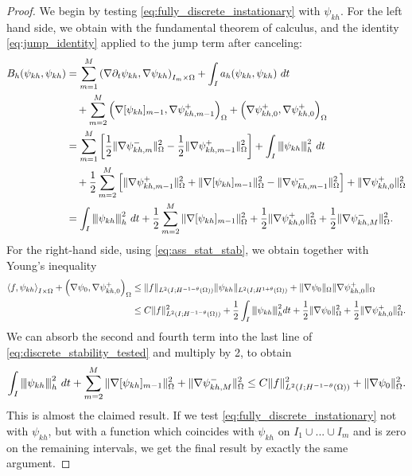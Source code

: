 \documentclass{m2an}
\newcommand{\1}{\mathds{1}}
\newcommand{\Om}{\Omega}
\newcommand{\ImOprod}[1]{\left( #1 \right)_{I_m\times \Omega}}
\newcommand{\IOpair}[1]{\left\langle #1 \right\rangle_{I\times \Omega}}
\newcommand{\psikh}{\psi_{kh}}
\newcommand{\na}{\nabla}
\newcommand{\pa}{\partial}
\newcommand{\vertiii}[1]{{\left\vert\kern-0.25ex\left\vert\kern-0.25ex\left\vert #1
    \right\vert\kern-0.25ex\right\vert\kern-0.25ex\right\vert}}
\newcommand{\Oprod}[1]{\left(#1\right)_{\Omega}}
\theoremstyle{definition}
\begin{document}
\begin{proof}
  We begin by testing \eqref{eq:fully_discrete_instationary} with $\psi_{kh}$. For the left hand side, we obtain
  with the fundamental theorem of calculus, and the identity \eqref{eq:jump_identity} applied 
  to the jump term after canceling:
  \begin{equation}\label{eq:discrete_stability_tested}
    \begin{aligned}
    B_h(\psikh,\psikh)  &= \sum_{m=1}^M \ImOprod{\nabla \pa_t \psikh,\na\psikh} + \int_I a_h(\psikh,\psikh) \ dt\\
                        & \quad + \sum_{m=2}^M \Oprod{\na [\psikh]_{m-1},\na \psi_{kh,m-1}^+} 
                            + \Oprod{\na \psi_{kh,0}^+,\na \psi_{kh,0}^+}\\
                        &= \sum_{m=1}^M \left[\frac12 \|\na \psi_{kh,m}^-\|_\Om^2 - \frac12 \|\na \psi_{kh,m-1}^+\|_\Om^2\right]
                             + \int_I \vertiii{\psikh}^2_h \ dt\\
                        & \quad + \frac12 \sum_{m=2}^M \left[\|\na \psi_{kh,m-1}^+\|_\Om^2 + \|\na [\psi_{kh}]_{m-1}\|_\Om^2 - \|\na \psi_{kh,m-1}^-\|_\Om^2 \right]
                            + \|\na \psi_{kh,0}^+\|_\Om^2\\
                        &=\int_I \vertiii{\psikh}^2_h \ dt + \frac12 \sum_{m=2}^M \|\na [\psi_{kh}]_{m-1}\|_\Om^2 
                          + \frac12 \|\na \psi_{kh,0}^+\|_\Om^2+ \frac12 \|\na \psi_{kh,M}^-\|_\Om^2.
  \end{aligned}
  \end{equation}
  For the right-hand side, using \eqref{eq:ass_stat_stab}, we obtain together with Young's inequality
  \begin{align*}
    \IOpair{f,\psikh} + \Oprod{\na \psi_0,\na \psi_{kh,0}^+}
    &\le \|f\|_{L^2(I;H^{-1-\theta}(\Om))}\|\psikh\|_{L^2(I;H^{1+\theta}(\Om))} + \|\na \psi_0\|_\Om \|\na \psi_{kh,0}^+\|_\Om\\
    &\le C \|f\|_{L^2(I;H^{-1-\theta}(\Om))}^2 + \frac12 \int_I \vertiii{\psikh}_h^2 dt + \frac12 \|\na \psi_0\|_\Om^2 
      + \frac12 \|\na \psi_{kh,0}^+\|_\Om^2.
  \end{align*}
  We can absorb the second and fourth term into the last line of \eqref{eq:discrete_stability_tested}
  and multiply by 2, to obtain
  \begin{equation*}
    \int_I \vertiii{\psikh}^2_h \ dt + \sum_{m=2}^M \|\na [\psi_{kh}]_{m-1}\|_\Om^2 
    + \|\na \psi_{kh,M}^-\|_\Om^2
    \le C \|f\|_{L^2(I;H^{-1-\theta}(\Om))}^2 +  \|\na \psi_0\|_\Om^2 .
  \end{equation*}
  This is almost the claimed result. If we test \eqref{eq:fully_discrete_instationary}
  not with $\psikh$, but with a function which coincides with $\psikh$ on $I_1 \cup ... \cup I_m$
  and is zero on the remaining intervals, we get the final result by exactly the same argument.
\end{proof}
\end{document}
